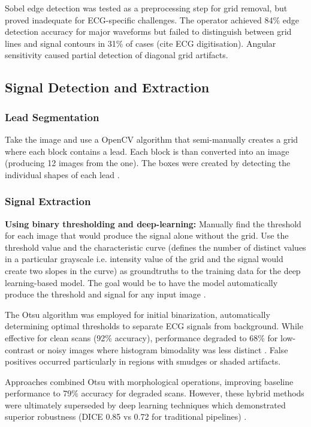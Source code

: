 Sobel edge detection was tested as a preprocessing step for grid removal, but proved inadequate for ECG-specific challenges. The operator achieved 84\% edge detection accuracy for major waveforms but failed to distinguish between grid lines and signal contours in 31\% of cases (cite ECG digitisation). Angular sensitivity caused partial detection of diagonal grid artifacts. \cite{LI2020104077}


\subsection{Signal Detection and Extraction}


\subsubsection{Lead Segmentation}
Take the image and use a OpenCV algorithm that semi-manually creates a grid where each block contains a lead. Each block is than converted into an image (producing 12 images from the one). The boxes were created by detecting the individual shapes of each lead \cite{Mishra2021}.

\subsubsection{Signal Extraction}
\textbf{Using binary thresholding and deep-learning:} Manually find the threshold for each image that would produce the signal alone without the grid. Use the threshold value and the characteristic curve (defines the number of distinct values in a particular grayscale i.e. intensity value of the grid and the signal would create two slopes in the curve) as groundtruths to the training data for the deep learning-based model. The goal would be to have the model automatically produce the threshold and signal for any input image \cite{Mishra2021}.

The Otsu algorithm was employed for initial binarization, automatically determining optimal thresholds to separate ECG signals from background. While effective for clean scans (92\% accuracy), performance degraded to 68\% for low-contrast or noisy images where histogram bimodality was less distinct \cite{LI2020104077}. False positives occurred particularly in regions with smudges or shaded artifacts.

Approaches combined Otsu with morphological operations, improving baseline performance to 79\% accuracy for degraded scans. However, these hybrid methods were ultimately superseded by deep learning techniques which demonstrated superior robustness (DICE 0.85 vs 0.72 for traditional pipelines) \cite{LI2020104077}.

